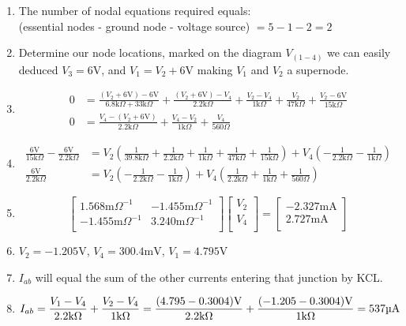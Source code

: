 \documentclass[12pt]{article}
\def\k{\mathrm{k}}
\def\V{\mathrm{V}}
\def\A{\mathrm{A}}
\def\m{\mathrm{m}}
\def\u{\textrm{\textmu}}
\begin{document}
\begin{enumerate}
	\item The number of nodal equations required equals: \\ (essential nodes - ground node - voltage source) $= 5-1-2=2$
	\item Determine our node locations, marked on the diagram $V_{(1-4)}$ we can easily deduced $V_3=6\V$, and $V_1=V_2+6\V$ making $V_1$ and $V_2$ a supernode.
	\item \begin{align*}
		      0 & =\frac{(V_2+6\V)-6\V}{6.8\k\Omega+33\k\Omega}
		      +\frac{(V_2+6\V)-V_4}{2.2\k\Omega}
		      +\frac{V_2-V_4}{1\k\Omega}
		      +\frac{V_2}{47\k\Omega}
		      +\frac{V_2-6\V}{15\k\Omega}                       \\
		      0 & =\frac{V_4-(V_2+6\V)}{2.2\k\Omega}
		      +\frac{V_4-V_2}{1\k\Omega}
		      +\frac{V_4}{560\Omega}
	      \end{align*}
	\item \begin{align*}
		      \frac{6\V}{15\k\Omega}-\frac{6\V}{2.2\k\Omega} & =V_2\left(\frac{1}{39.8\k\Omega}
		      +\frac{1}{2.2\k\Omega}
		      +\frac{1}{1\k\Omega}
		      +\frac{1}{47\k\Omega}
		      +\frac{1}{15\k\Omega}\right)
		      +V_4\left(-\frac{1}{2.2\k\Omega}
		      -\frac{1}{1\k\Omega}\right)
		      \\
		      \frac{6\V}{2.2\k\Omega}                        & =
		      V_2\left(-\frac{1}{2.2\k\Omega}-\frac{1}{1\k\Omega}\right)
		      +V_4\left(\frac{1}{2.2\k\Omega}
		      +\frac{1}{1\k\Omega}
		      +\frac{1}{560\Omega}\right)
	      \end{align*}
	\item \[
		      \begin{bmatrix}
			      1.568\m\Omega^{-1}  & -1.455\m\Omega^{-1} \\
			      -1.455\m\Omega^{-1} & 3.240\m\Omega^{-1}  \\
		      \end{bmatrix}
		      \begin{bmatrix}
			      V_2 \\
			      V_4 \\
		      \end{bmatrix}
		      =
		      \begin{bmatrix}
			      -2.327\m\A \\
			      2.727\m\A  \\
		      \end{bmatrix}
	      \]
	\item $V_2=-1.205\V$, $V_4=300.4\m\V$, $V_1=4.795\V$
	\item $I_{ab}$ will equal the sum of the other currents entering that junction by KCL.
	\item $\displaystyle{I_{ab}=\frac{V_1-V_4}{2.2\k\Omega}+\frac{V_2-V_4}{1\k\Omega}=\frac{(4.795-0.3004)\V}{2.2\k\Omega}+\frac{(-1.205-0.3004)\V}{1\k\Omega}}=537\u\A$
\end{enumerate}
\end{document}
